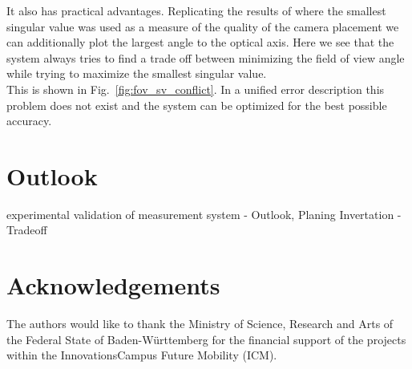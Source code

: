 \documentclass[5p,times,procedia]{elsarticle}
\begin{document}
It also has practical advantages.
Replicating the results of \cite{camera_placement} where the smallest singular value was used as a measure of the quality of the camera placement we can additionally plot the largest angle to the optical axis.
Here we see that the system always tries to find a trade off between minimizing the field of view angle while trying to maximize the smallest singular value.\\
This is shown in Fig.~\ref{fig:fov_sv_conflict}.
In a unified error description this problem does not exist and the system can be optimized for the best possible accuracy.



\section{Outlook}
experimental validation of measurement system
- Outlook, Planing Invertation
- Tradeoff



%

\section*{Acknowledgements}
The authors would like to thank the Ministry of Science, Research and Arts of the Federal State of Baden-Württemberg for the financial support of the projects within the InnovationsCampus Future Mobility (ICM).



\end{document}
